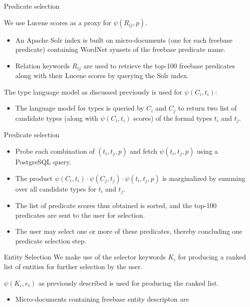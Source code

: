\documentclass[pdf,11pt]{beamer}
\begin{document}
\begin{frame}{Predicate selection}

We use Lucene scores as a proxy for $\psi(R_{ij}, p)$.
\begin{itemize}
\item An Apache Solr index is built on micro-documents (one for each freebase predicate) containing WordNet synsets of the freebase predicate name. 
\item Relation keywords $R_{ij}$ are used to retrieve the top-100 freebase predicates along with their Lucene scores by querying the Solr index.
\end{itemize}


The type language model as discussed previously is used for $\psi(C_i,t_i)$:
\begin{itemize}
\item The language model for types is queried by $C_i$ and $C_j$ to return two list of candidate types (along with $\psi(C_i,t_i)$ scores) of the formal types $t_i$ and $t_j$.

\end{itemize}

\end{frame}

\begin{frame}{Predicate selection}
\begin{itemize}
\item Probe each combination of $(t_i,t_j,p)$  and fetch $\psi(t_i,t_j,p)$ using a PostgreSQL query. 
\item The product $\psi(C_i,t_i) \cdot \psi(C_j,t_j) \cdot \psi(t_i,t_j,p)$ is  marginalized by summing over all candidate types for $t_i$ and $t_j$.
 
\item The list of predicate scores thus obtained is sorted, and the top-100 predicates are sent to the user for selection. 
\item The user may select one or more of these predicates, thereby concluding one predicate selection step.	
\end{itemize}
\end{frame}

\begin{frame}{Entity Selection}
We make use of the selector keywords $K_i$ for producing a ranked list of entities for further selection by the user.

$ \psi(K_i,e_i)$ as previously described is used for producing the ranked list.

\begin{itemize}
\item Micro-documents containing freebase entity descripton are 
\end{itemize} 
\end{frame}
\end{document}
